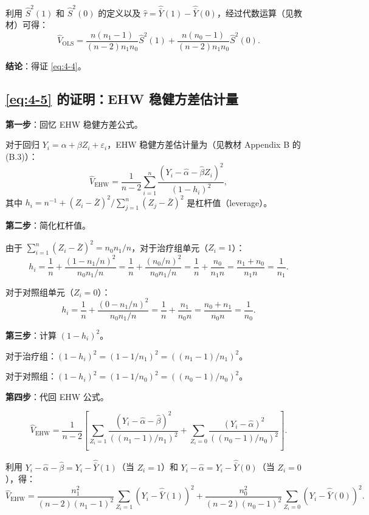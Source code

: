 利用 $\hat{S}^2(1)$ 和 $\hat{S}^2(0)$ 的定义以及 $\hat{\tau} = \hat{\bar{Y}}(1) - \hat{\bar{Y}}(0)$，经过代数运算（见教材）可得：
\[
\hat{V}_{\text{OLS}} = \frac{n(n_1-1)}{(n-2)n_1 n_0}\hat{S}^2(1) + \frac{n(n_0-1)}{(n-2)n_1 n_0}\hat{S}^2(0).
\]

\textbf{结论}：得证 \eqref{eq:4-4}。

\subsection*{\eqref{eq:4-5} 的证明：EHW 稳健方差估计量}\label{sec:appendix-ehw-proof}

\textbf{第一步}：回忆 EHW 稳健方差公式。

对于回归 $Y_i = \alpha + \beta Z_i + \varepsilon_i$，EHW 稳健方差估计量为（见教材 Appendix B 的 (B.3)）：
\[
\hat{V}_{\text{EHW}} = \frac{1}{n-2}\sum_{i=1}^n \frac{(Y_i - \hat{\alpha} - \hat{\beta} Z_i)^2}{(1 - h_i)^2},
\]
其中 $h_i = n^{-1} + (Z_i - \bar{Z})^2/\sum_{j=1}^n (Z_j - \bar{Z})^2$ 是杠杆值（leverage）。

\textbf{第二步}：简化杠杆值。

由于 $\sum_{i=1}^n (Z_i - \bar{Z})^2 = n_0 n_1/n$，对于治疗组单元（$Z_i=1$）：
\[
h_i = \frac{1}{n} + \frac{(1 - n_1/n)^2}{n_0 n_1/n} = \frac{1}{n} + \frac{(n_0/n)^2}{n_0 n_1/n} = \frac{1}{n} + \frac{n_0}{n_1 n} = \frac{n_1 + n_0}{n_1 n} = \frac{1}{n_1}.
\]

对于对照组单元（$Z_i=0$）：
\[
h_i = \frac{1}{n} + \frac{(0 - n_1/n)^2}{n_0 n_1/n} = \frac{1}{n} + \frac{n_1}{n_0 n} = \frac{n_0 + n_1}{n_0 n} = \frac{1}{n_0}.
\]

\textbf{第三步}：计算 $(1 - h_i)^2$。

对于治疗组：$(1 - h_i)^2 = (1 - 1/n_1)^2 = ((n_1-1)/n_1)^2$。

对于对照组：$(1 - h_i)^2 = (1 - 1/n_0)^2 = ((n_0-1)/n_0)^2$。

\textbf{第四步}：代回 EHW 公式。

\[
\hat{V}_{\text{EHW}} = \frac{1}{n-2}\left[\sum_{Z_i=1}\frac{(Y_i - \hat{\alpha} - \hat{\beta})^2}{((n_1-1)/n_1)^2} + \sum_{Z_i=0}\frac{(Y_i - \hat{\alpha})^2}{((n_0-1)/n_0)^2}\right].
\]

利用 $Y_i - \hat{\alpha} - \hat{\beta} = Y_i - \hat{\bar{Y}}(1)$（当 $Z_i=1$）和 $Y_i - \hat{\alpha} = Y_i - \hat{\bar{Y}}(0)$（当 $Z_i=0$），得：
\[
\hat{V}_{\text{EHW}} = \frac{n_1^2}{(n-2)(n_1-1)^2}\sum_{Z_i=1}(Y_i - \hat{\bar{Y}}(1))^2 + \frac{n_0^2}{(n-2)(n_0-1)^2}\sum_{Z_i=0}(Y_i - \hat{\bar{Y}}(0))^2.
\]

